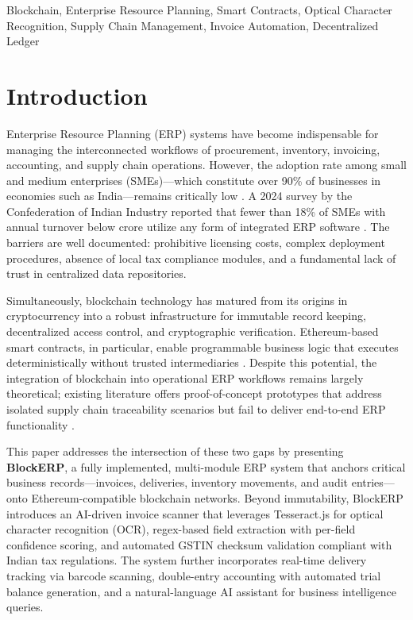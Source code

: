 \documentclass[conference]{IEEEtran}
\begin{document}
\begin{IEEEkeywords}
Blockchain, Enterprise Resource Planning, Smart Contracts, Optical Character Recognition, Supply Chain Management, Invoice Automation, Decentralized Ledger
\end{IEEEkeywords}

\section{Introduction}

Enterprise Resource Planning (ERP) systems have become indispensable for managing the interconnected workflows of procurement, inventory, invoicing, accounting, and supply chain operations. However, the adoption rate among small and medium enterprises (SMEs)—which constitute over 90\% of businesses in economies such as India—remains critically low \cite{b1}. A 2024 survey by the Confederation of Indian Industry reported that fewer than 18\% of SMEs with annual turnover below  crore utilize any form of integrated ERP software \cite{b2}. The barriers are well documented: prohibitive licensing costs, complex deployment procedures, absence of local tax compliance modules, and a fundamental lack of trust in centralized data repositories.

Simultaneously, blockchain technology has matured from its origins in cryptocurrency into a robust infrastructure for immutable record keeping, decentralized access control, and cryptographic verification. Ethereum-based smart contracts, in particular, enable programmable business logic that executes deterministically without trusted intermediaries \cite{b3}. Despite this potential, the integration of blockchain into operational ERP workflows remains largely theoretical; existing literature offers proof-of-concept prototypes that address isolated supply chain traceability scenarios but fail to deliver end-to-end ERP functionality \cite{b4}.

This paper addresses the intersection of these two gaps by presenting \textbf{BlockERP}, a fully implemented, multi-module ERP system that anchors critical business records—invoices, deliveries, inventory movements, and audit entries—onto Ethereum-compatible blockchain networks. Beyond immutability, BlockERP introduces an AI-driven invoice scanner that leverages Tesseract.js for optical character recognition (OCR), regex-based field extraction with per-field confidence scoring, and automated GSTIN checksum validation compliant with Indian tax regulations. The system further incorporates real-time delivery tracking via barcode scanning, double-entry accounting with automated trial balance generation, and a natural-language AI assistant for business intelligence queries.
\end{document}
